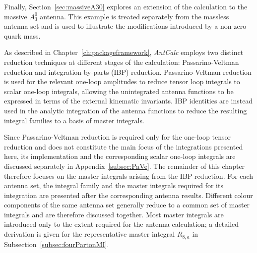 Finally, Section~\ref{sec:massiveA30} explores an extension of the calculation to the massive
$A_3^0$ antenna. This example is treated separately from the massless antenna set and is used to
illustrate the modifications introduced by a non-zero quark mass.

As described in Chapter~\ref{ch:packageframework}, \textit{AntCalc} employs two distinct
reduction techniques at different stages of the calculation: Passarino-Veltman reduction and
integration-by-parts (IBP) reduction. Passarino-Veltman reduction is used for the relevant one-loop
amplitudes to reduce tensor loop integrals to scalar one-loop integrals, allowing the unintegrated
antenna functions to be expressed in terms of the external kinematic invariants. IBP identities are
instead used in the analytic integration of the antenna functions to reduce the resulting integral
families to a basis of master integrals.

Since Passarino-Veltman reduction is required only for the one-loop tensor reduction and does not
constitute the main focus of the integrations presented here, its implementation and the
corresponding scalar one-loop integrals are discussed separately in
Appendix~\ref{subsec:PaVe}. The remainder of this chapter therefore focuses on the master integrals
arising from the IBP reduction. For each antenna set, the integral family and the master integrals
required for its integration are presented after the corresponding antenna results. Different colour
components of the same antenna set generally reduce to a common set of master integrals and are
therefore discussed together. Most master integrals are introduced only to the extent required for
the antenna calculation; a detailed derivation is given for the representative master integral
$R_{8,a}$ in Subsection~\ref{subsec:fourPartonMI}.

